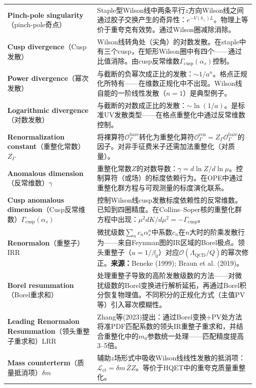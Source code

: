 \documentclass[12pt,a4paper]{ctexart}
\begin{document}
\begin{longtable}{p{3.5cm}p{9cm}}
\textbf{Pinch-pole singularity}（pinch-pole奇点）& Staple型Wilson线中两条平行$z$方向Wilson线之间通过胶子交换产生的奇异性：$e^{-V(b_\perp)L}$。物理上等价于重夸克有效势。通过Wilson圈减除消除。\\
\textbf{Cusp divergence}（Cusp发散）& Wilson线转角处（尖角）的对数发散。在staple中有三个cusp，在矩形Wilson圈中有四个——通过比值消除。由cusp反常维数$\Gamma_{\text{cusp}}(\alpha_s)$控制。\\
\textbf{Power divergence}（幂次发散）& 与截断的负幂次成正比的发散：$\sim 1/a^n$。格点正规化所特有——在维数正规化中不出现。Wilson线自能的一阶线性发散（$n=1$）是典型例子。\\
\textbf{Logarithmic divergence}（对数发散）& 与截断的对数成正比的发散：$\sim \ln(1/a)$。是标准UV发散类型——在格点重整化中通过反常维数控制。\\
\textbf{Renormalization constant}（重整化常数）$Z_\Gamma$& 将裸算符$\mathcal{O}_\Gamma^{\text{bare}}$转化为重整化算符$\mathcal{O}_\Gamma^{\text{ren}} = Z_\Gamma \mathcal{O}_\Gamma^{\text{bare}}$的因子。对非手征费米子还需加法重整化（对质量）。\\
\textbf{Anomalous dimension}（反常维数）$\gamma$& 重整化常数$Z$的对数导数：$\gamma = d\ln Z / d\ln\mu$。控制算符（或场）的标度依赖行为。在OPE中通过重整化群方程与可观测量的标度演化联系。\\
\textbf{Cusp anomalous dimension}（Cusp反常维数）$\Gamma_{\text{cusp}}(\alpha_s)$& 控制Wilson线cusp发散标度依赖性的反常维数。已知到四圈精度。在Collins--Soper核的重整化群方程中出现：$\mu^2 dK/d\mu^2 = -\Gamma_{\text{cusp}}$。\\
\textbf{Renormalon}（重整子）IRR& 微扰级数$\sum_n c_n \alpha_s^n$中系数$c_n$在$n$大时的阶乘发散行为——来自Feynman图的IR区域的Borel极点。领头重整子（$u=1/\beta_0$）对应$\mathcal{O}(\Lambda_{\text{QCD}}/Q)$的幂次修正。\textbf{来源：}Beneke (1999); Braun et al. (2019)。\\
\textbf{Borel resummation}（Borel重求和）& 处理重整子导致的高阶发散级数的方法——对微扰级数的Borel变换进行解析延拓，再通过Borel积分恢复物理值。不同积分的正规化方式（主值PV等）引入幂次模糊性。\\
\textbf{Leading Renormalon Resummation}（领头重整子重求和）LRR& Zhang等(2023)提出：通过Borel变换+PV处方法将准PDF匹配系数的领头IR重整子重求和，并结合重整化中的$m_0$参数统一处理——匹配精度提高3--5倍。\\
\textbf{Mass counterterm}（质量抵消项）$\delta m$& 辅助$z$场形式中吸收Wilson线线性发散的抵消项：$\mathcal{L}_{\text{ct}} = \delta m\,\bar Z Z$。等价于HQET中的重夸克质量重整化。\\

\end{longtable}
\end{document}

